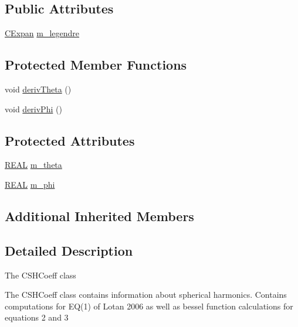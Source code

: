 \subsection*{Public Attributes}
\begin{DoxyCompactItemize}
\item 
\hyperlink{classCExpan}{C\-Expan} \hyperlink{classCSHExpan_aa1762978841609a0e44e0a67ab8c14ae}{m\-\_\-legendre}
\end{DoxyCompactItemize}
\subsection*{Protected Member Functions}
\begin{DoxyCompactItemize}
\item 
void \hyperlink{classCSHExpan_aef64dd554e7b065b558611b26f9b29e3}{deriv\-Theta} ()
\item 
void \hyperlink{classCSHExpan_a89004d8e01e26b6c767477015dd8486c}{deriv\-Phi} ()
\end{DoxyCompactItemize}
\subsection*{Protected Attributes}
\begin{DoxyCompactItemize}
\item 
\hyperlink{util_8h_a5821460e95a0800cf9f24c38915cbbde}{R\-E\-A\-L} \hyperlink{classCSHExpan_acd0e3ac848f0196a389d66124601cc39}{m\-\_\-theta}
\item 
\hyperlink{util_8h_a5821460e95a0800cf9f24c38915cbbde}{R\-E\-A\-L} \hyperlink{classCSHExpan_a57187dc86ecba1c73324e1305715cc63}{m\-\_\-phi}
\end{DoxyCompactItemize}
\subsection*{Additional Inherited Members}


\subsection{Detailed Description}
The C\-S\-H\-Coeff class

The C\-S\-H\-Coeff class contains information about spherical harmonics. Contains computations for E\-Q(1) of Lotan 2006 as well as bessel function calculations for equations 2 and 3 

